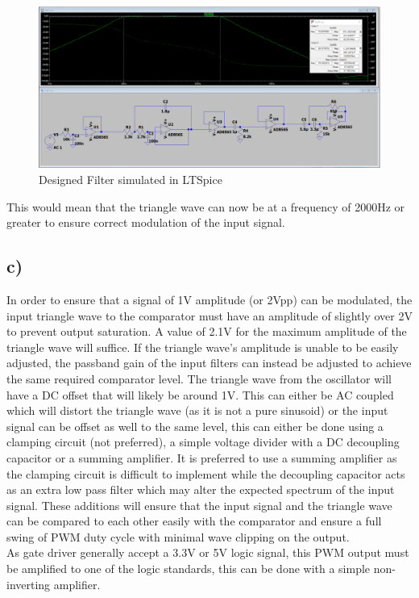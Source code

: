 \documentclass[]{article}
\begin{document}
	\begin{figure}[H]
		\centering
		\includegraphics[width=1\linewidth]{screenshot001}
		\caption{Designed Filter simulated in LTSpice}
		\label{fig:screenshot001}
	\end{figure}
\begin{multicols}{2}
	This would mean that the triangle wave can now be at a frequency of 2000Hz or greater to ensure correct modulation of the input signal.
	\subsection{c)}
	In order to ensure that a signal of 1V amplitude (or 2Vpp) can be modulated, the input triangle wave to the comparator must have an amplitude of slightly over 2V to prevent output saturation. A value of 2.1V for the maximum amplitude of the triangle wave will suffice. If the triangle wave's amplitude is unable to be easily adjusted, the passband gain of the input filters can instead be adjusted to achieve the same required comparator level.
	The triangle wave from the oscillator will have a DC offset that will likely be around 1V. This can either be AC coupled which will distort the triangle wave (as it is not a pure sinusoid) or the input signal can be offset as well to the same level, this can either be done using a clamping circuit (not preferred), a simple voltage divider with a DC decoupling capacitor or a summing amplifier. It is preferred to use a summing amplifier as the clamping circuit is difficult to implement while the decoupling capacitor acts as an extra low pass filter which may alter the expected spectrum of the input signal.
	These additions will ensure that the input signal and the triangle wave can be compared to each other easily with the comparator and ensure a full swing of PWM duty cycle with minimal wave clipping on the output.\\
	As gate driver generally accept a 3.3V or 5V logic signal, this PWM output must be amplified to one of the logic standards, this can be done with a simple non-inverting amplifier.
\end{multicols}
\end{document}
